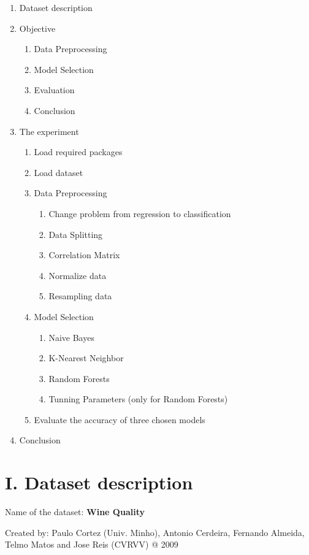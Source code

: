 \documentclass{article}
\providecommand{\tightlist}{%
      \setlength{\itemsep}{0pt}\setlength{\parskip}{0pt}}
\begin{document}
\begin{enumerate}
\def\labelenumi{\arabic{enumi}.}
\tightlist
\item
  Dataset description
\item
  Objective
  \begin{enumerate}
  \item Data Preprocessing
  \item Model Selection
  \item Evaluation
  \item Conclusion
  \end{enumerate}
\item
  The experiment
  \begin{enumerate}
  \item Load required packages
  \item Load dataset
  \item Data Preprocessing
	  \begin{enumerate}
	\item Change problem from regression to classification
	\item Data Splitting
	\item Correlation Matrix
	\item Normalize data
	\item Resampling data  
  	\end{enumerate}
  \item Model Selection
  \begin{enumerate}
	\item Naive Bayes
	\item K-Nearest Neighbor
	\item Random Forests
	\item Tunning Parameters (only for Random Forests)
	\end{enumerate}  
  \item Evaluate the accuracy of three chosen models
  \end{enumerate}
\item
  Conclusion
\end{enumerate}

\section*{I. Dataset description}\label{i.-dataset-description}

\hspace{5mm}Name of the dataset: \textbf{Wine Quality}

Created by: Paulo Cortez (Univ. Minho), Antonio Cerdeira, Fernando
Almeida, Telmo Matos and Jose Reis (CVRVV) @ 2009
\end{document}
